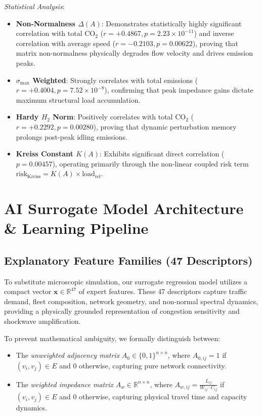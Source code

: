 \documentclass[lettersize,journal]{IEEEtran}
\begin{document}
\textit{Statistical Analysis}:
\begin{itemize}
    \item \textbf{Non-Normalness $\Delta(A)$}: Demonstrates statistically highly significant correlation with total $\text{CO}_2$ ($r = +0.4867, p = 2.23 \times 10^{-11}$) and inverse correlation with average speed ($r = -0.2103, p = 0.00622$), proving that matrix non-normalness physically degrades flow velocity and drives emission peaks.
    \item \textbf{$\sigma_{\max}$ Weighted}: Strongly correlates with total emissions ($r = +0.4004, p = 7.52 \times 10^{-8}$), confirming that peak impedance gains dictate maximum structural load accumulation.
    \item \textbf{Hardy $H_2$ Norm}: Positively correlates with total $\text{CO}_2$ ($r = +0.2292, p = 0.00280$), proving that dynamic perturbation memory prolongs post-peak idling emissions.
    \item \textbf{Kreiss Constant $K(A)$}: Exhibits significant direct correlation ($p = 0.00457$), operating primarily through the non-linear coupled risk term $\text{risk}_{\text{Kreiss}} = K(A) \times \text{load}_{\text{rel}}$.
\end{itemize}

\section{AI Surrogate Model Architecture \& Learning Pipeline}

\subsection{Explanatory Feature Families (47 Descriptors)}
To substitute microscopic simulation, our surrogate regression model utilizes a compact vector $\mathbf{x} \in \mathbb{R}^{47}$ of expert features. These 47 descriptors capture traffic demand, fleet composition, network geometry, and non-normal spectral dynamics, providing a physically grounded representation of congestion sensitivity and shockwave amplification. 

To prevent mathematical ambiguity, we formally distinguish between:
\begin{itemize}
    \item The \emph{unweighted adjacency matrix} $A_0 \in \{0, 1\}^{n \times n}$, where $A_{0, ij} = 1$ if $(v_i, v_j) \in E$ and $0$ otherwise, capturing pure network connectivity.
    \item The \emph{weighted impedance matrix} $A_w \in \mathbb{R}^{n \times n}$, where $A_{w, ij} = \frac{L_{ij}}{W_{ij} \cdot C_{ij}}$ if $(v_i, v_j) \in E$ and $0$ otherwise, capturing physical travel time and capacity dynamics.
\end{itemize}
\end{document}

